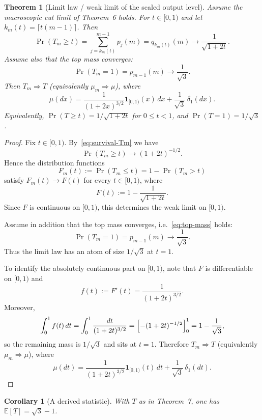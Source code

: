 \documentclass[11pt]{article}
\newtheorem{corollary}{Corollary}
\newtheorem{theorem}{Theorem}
\begin{document}
\newpage

\begin{theorem}[Limit law / weak limit of the scaled output level]\label{thm:limit-law-shape}
Assume the macroscopic cut limit of Theorem~6 holds. For $t\in[0,1)$ and let
$k_m(t)=\lceil t(m-1)\rceil$. Then
\begin{equation}\label{eq:survival-Tm}
\Pr(T_m\ge t)=\sum_{j=k_m(t)}^{m-1} p_j(m)=q_{k_m(t)}(m)\longrightarrow \frac1{\sqrt{1+2t}}.
\end{equation}
Assume also that the top mass converges:
\begin{equation}\label{eq:top-mass}
\Pr(T_m=1)=p_{m-1}(m)\longrightarrow \frac1{\sqrt3}.
\end{equation}
Then $T_m\Rightarrow T$ (equivalently $\mu_m\Rightarrow\mu$), where
\begin{equation}\label{eq:limit-law}
\mu(dx)=\frac{1}{(1+2x)^{3/2}}\mathbf 1_{[0,1)}(x)\,dx+\frac1{\sqrt3}\,\delta_1(dx).
\end{equation}
Equivalently, $\Pr(T\ge t)=1/\sqrt{1+2t}$ for $0\le t<1$, and $\Pr(T=1)=1/\sqrt3$.
\end{theorem}

\begin{proof}
Fix $t\in[0,1)$. By~\eqref{eq:survival-Tm} we have
\[
\Pr(T_m\ge t)\longrightarrow (1+2t)^{-1/2}.
\]
Hence the distribution functions
\[
F_m(t):=\Pr(T_m\le t)=1-\Pr(T_m>t)
\]
satisfy $F_m(t)\to F(t)$ for every $t\in[0,1)$, where
\[
F(t):=1-\frac{1}{\sqrt{1+2t}}.
\]
Since $F$ is continuous on $[0,1)$, this determines the weak limit on $[0,1)$.

Assume in addition that the top mass converges, i.e.~\eqref{eq:top-mass} holds:
\[
\Pr(T_m=1)=p_{m-1}(m)\longrightarrow \frac{1}{\sqrt3}.
\]
Thus the limit law has an atom of size $1/\sqrt3$ at $t=1$.

To identify the absolutely continuous part on $[0,1)$, note that $F$ is differentiable on $[0,1)$ and
\[
f(t):=F'(t)=\frac{1}{(1+2t)^{3/2}}.
\]
Moreover,
\[
\int_0^1 f(t)\,dt=\int_0^1 \frac{dt}{(1+2t)^{3/2}}
=\Bigl[-(1+2t)^{-1/2}\Bigr]_{0}^{1}
=1-\frac{1}{\sqrt3},
\]
so the remaining mass is $1/\sqrt3$ and sits at $t=1$. Therefore $T_m\Rightarrow T$
(equivalently $\mu_m\Rightarrow\mu$), where
\[
\mu(dt)=\frac{1}{(1+2t)^{3/2}}\mathbf 1_{[0,1)}(t)\,dt+\frac{1}{\sqrt3}\,\delta_1(dt).
\]
\end{proof}

\begin{corollary}[A derived statistic]
With $T$ as in Theorem~7, one has $\mathbb{E}[T]=\sqrt{3}-1$.
\end{corollary}
\end{document}
